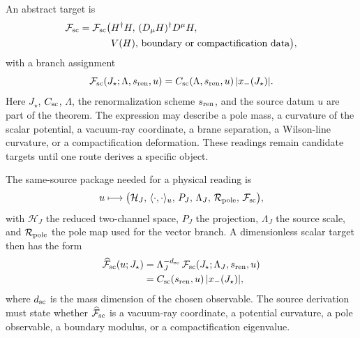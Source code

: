 An abstract target is
\begin{equation}
  \begin{aligned}
  \mathcal F_{\rm sc}
  =
  \mathcal F_{\rm sc}\big(&
  H^\dagger H,\,
  (D_\mu H)^\dagger D^\mu H,\\
  &V(H),\,
  \hbox{boundary or compactification data}
  \big),
  \end{aligned}
  \label{eq:scalar-functional-general}
\end{equation}
with a branch assignment
\begin{equation}
  \mathcal F_{\rm sc}(J_\star;\Lambda,s_{\rm ren},u)
  =
  C_{\rm sc}(\Lambda,s_{\rm ren},u)\,|x_-(J_\star)|.
  \label{eq:scalar-functional-branch}
\end{equation}
Here \(J_\star\), \(C_{\rm sc}\), \(\Lambda\), the renormalization scheme \(s_{\rm ren}\), and the source datum \(u\) are part of the theorem.  The expression may describe a pole mass, a curvature of the scalar potential, a vacuum-ray coordinate, a brane separation, a Wilson-line curvature, or a compactification deformation.  These readings remain candidate targets until one route derives a specific object.

The same-source package needed for a physical reading is
\begin{equation}
  u\longmapsto
  \big(
  \mathcal H_J,\,
  \langle\cdot,\cdot\rangle_u,\,
  P_J,\,
  \Lambda_J,\,
  \mathcal R_{\rm pole},\,
  \mathcal F_{\rm sc}
  \big),
  \label{eq:negative-same-source-package}
\end{equation}
with \(\mathcal H_J\) the reduced two-channel space, \(P_J\) the projection,
\(\Lambda_J\) the source scale, and \(\mathcal R_{\rm pole}\) the pole map used
for the vector branch.  A dimensionless scalar target then has the form
\begin{equation}
  \begin{aligned}
  \widehat{\mathcal F}_{\rm sc}(u;J_\star)
  &=
  \Lambda_J^{-d_{\rm sc}}\,
  \mathcal F_{\rm sc}(J_\star;\Lambda_J,s_{\rm ren},u)\\
  &=
  C_{\rm sc}(s_{\rm ren},u)\,|x_-(J_\star)|,
  \end{aligned}
  \label{eq:negative-hatted-scalar-functional}
\end{equation}
where \(d_{\rm sc}\) is the mass dimension of the chosen observable.  The source
derivation must state whether \(\widehat{\mathcal F}_{\rm sc}\) is a vacuum-ray
coordinate, a potential curvature, a pole observable, a boundary modulus, or a
compactification eigenvalue.

